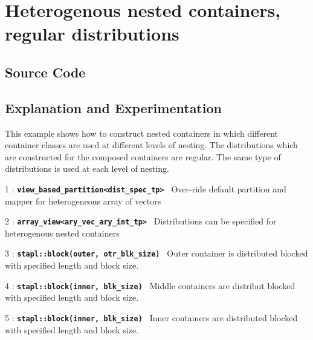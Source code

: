 \documentclass{report}
\begin{document}

\pagebreak
\section{Heterogenous nested containers, regular distributions}

\subsection{Source Code}



\subsection{Explanation and Experimentation}

This example shows how to construct nested containers in which different
container classes are used at different levels of nesting.  The distributions
which are constructed for the composed containers are regular.
The same type of distributions is used at each level of nesting.

\begin{hashitemize}
\item 1 : \texttt{{\bf view\_based\_partition<dist\_spec\_tp> }}
\newline
Over-ride default partition and mapper for heterogeneous array of vectors
\item 2 : \texttt{{\bf array\_view<ary\_vec\_ary\_int\_tp> }}
\newline
Distributions can be specified for heterogenous nested containers
\item 3 : \texttt{{\bf stapl::block(outer, otr\_blk\_size) }}
\newline
Outer container is distributed blocked with specified length and block size.
\item 4 : \texttt{{\bf stapl::block(inner, blk\_size) }}
\newline
Middle containers are distribut blocked with specified length and block size.
\item 5 : \texttt{{\bf stapl::block(inner, blk\_size) }}
\newline
Inner containers are distributed blocked with specified length and block size.
\end{hashitemize}

\end{document}
